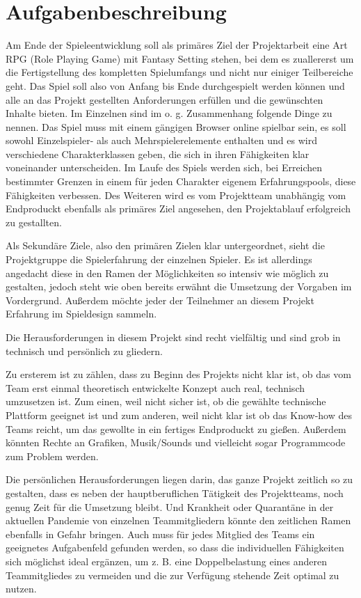 

\section{Aufgabenbeschreibung}


Am Ende der Spieleentwicklung soll als primäres Ziel der Projektarbeit eine Art RPG (Role Playing Game) mit Fantasy Setting stehen, bei dem es zuallererst um die Fertigstellung des kompletten Spielumfangs und nicht nur einiger Teilbereiche geht. Das Spiel soll also von Anfang bis Ende durchgespielt werden können und alle an das Projekt gestellten Anforderungen erfüllen und die gewünschten Inhalte bieten. Im Einzelnen sind im o. g. Zusammenhang folgende Dinge zu nennen. Das Spiel muss mit einem gängigen Browser online spielbar sein, es soll sowohl Einzelspieler- als auch Mehrspielerelemente enthalten und es wird verschiedene Charakterklassen geben, die sich in ihren Fähigkeiten klar voneinander unterscheiden. Im Laufe des Spiels werden sich, bei Erreichen bestimmter Grenzen in einem für jeden Charakter eigenem Erfahrungspools, diese Fähigkeiten verbessen. Des Weiteren wird es vom Projektteam unabhängig vom Endproduckt ebenfalls als primäres Ziel angesehen, den Projektablauf erfolgreich zu gestallten.

Als Sekundäre Ziele, also den primären Zielen klar untergeordnet, sieht die Projektgruppe die Spielerfahrung der einzelnen Spieler. Es ist allerdings angedacht diese in den Ramen der Möglichkeiten so intensiv wie möglich zu gestalten, jedoch steht wie oben bereits erwähnt die Umsetzung der Vorgaben im Vordergrund. Außerdem möchte jeder der Teilnehmer an diesem Projekt Erfahrung im Spieldesign sammeln.

Die Herausforderungen in diesem Projekt sind recht vielfältig und sind grob in technisch und persönlich zu gliedern.

Zu ersterem ist zu zählen, dass zu Beginn des Projekts nicht klar ist, ob das vom Team erst einmal theoretisch entwickelte Konzept auch real, technisch umzusetzen ist. Zum einen, weil nicht sicher ist, ob die gewählte technische Plattform geeignet ist und zum anderen, weil nicht klar ist ob das Know-how des Teams reicht, um das gewollte in ein fertiges Endproduckt zu gießen. Außerdem könnten Rechte an Grafiken, Musik/Sounds und vielleicht sogar Programmcode zum Problem werden.

Die persönlichen Herausforderungen liegen darin, das ganze Projekt zeitlich so zu gestalten, dass es neben der hauptberuflichen Tätigkeit des Projektteams, noch genug Zeit für die Umsetzung bleibt. Und Krankheit oder Quarantäne in der aktuellen Pandemie von einzelnen Teammitgliedern könnte den zeitlichen Ramen ebenfalls in Gefahr bringen. Auch muss für jedes Mitglied des Teams ein geeignetes Aufgabenfeld gefunden werden, so dass die individuellen Fähigkeiten sich möglichst ideal ergänzen, um z. B. eine Doppelbelastung eines anderen Teammitgliedes zu vermeiden und die zur Verfügung stehende Zeit optimal zu nutzen.




